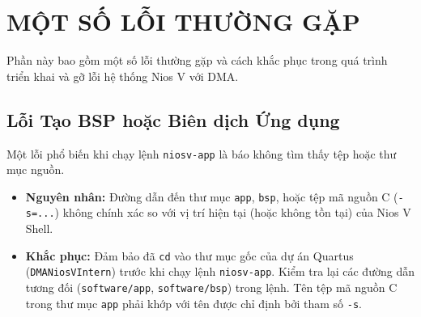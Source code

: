\appendix
\renewcommand{\thechapter}{B} %

\chapter{MỘT SỐ LỖI THƯỜNG GẶP}
\label{Appendix2}

Phần này bao gồm một số lỗi thường gặp và cách khắc phục trong quá trình triển khai và gỡ lỗi hệ thống Nios V với DMA.

\section{Lỗi Tạo BSP hoặc Biên dịch Ứng dụng}
\label{sec:trouble_bsp_app}

Một lỗi phổ biến khi chạy lệnh \texttt{niosv-app} là báo không tìm thấy tệp hoặc thư mục nguồn.
\begin{itemize}
    \item \textbf{Nguyên nhân:} Đường dẫn đến thư mục \texttt{app}, \texttt{bsp}, hoặc tệp mã nguồn C (\texttt{-s=...}) không chính xác so với vị trí hiện tại (hoặc không tồn tại) của Nios V Shell. 
    \item \textbf{Khắc phục:} Đảm bảo đã \texttt{cd} vào thư mục gốc của dự án Quartus (\texttt{DMANiosVIntern}) trước khi chạy lệnh \texttt{niosv-app}. Kiểm tra lại các đường dẫn tương đối (\texttt{software/app}, \texttt{software/bsp}) trong lệnh. Tên tệp mã nguồn C trong thư mục \texttt{app} phải khớp với tên được chỉ định bởi tham số \texttt{-s}.
\end{itemize}